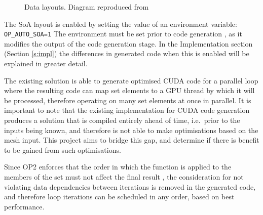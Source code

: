 \begin{figure}[h]
  \centering

  \quad

  \caption{\label{fig:SoA_v_AoS} Data layouts. Diagram reproduced from \cite{gpudesign}}
\end{figure}

\noindent The SoA layout is enabled by setting the value of an environment variable:\\ \verb|OP_AUTO_SOA=1|
The environment must be set prior to code generation \cite[p13]{manual}, as it modifies the output of the code generation stage. In the Implementation section (Section \ref{s:impl}) the differences in generated code when this is enabled will be explained in greater detail.
\par
The existing solution is able to generate optimised CUDA code for a parallel loop where the resulting code can map set elements to a GPU thread by which it will be processed, therefore operating on many set elements at once in parallel. It is important to note that the existing implementation for CUDA code generation produces a solution that is compiled entirely ahead of time, i.e.\ prior to the inputs being known, and therefore is not able to make optimisations based on the mesh input. This project aims to bridge this gap, and determine if there is benefit to be gained from such optimisations.
\par
Since OP2 enforces that the order in which the function is applied to the members of the set must not affect the final result \cite[p4]{manual}, the consideration for not violating data dependencies between iterations is removed in the generated code, and therefore loop iterations can be scheduled in any order, based on best performance.


